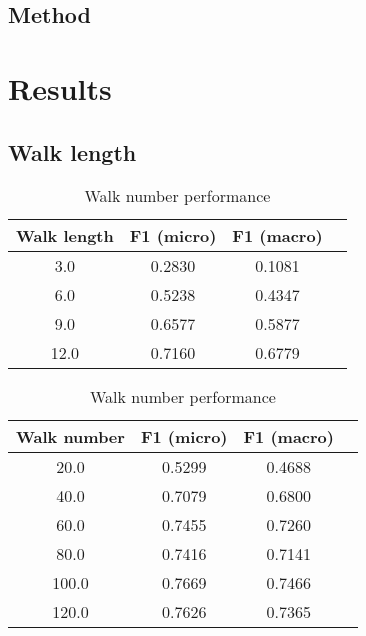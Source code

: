\documentclass[a4paper,10pt]{article}
\begin{document}
\subsection{Method}



\section{Results}

\subsection{Walk length}

\begin{table}[!hbtp]

  \centering

  \begin{minipage}[b]{0.48\textwidth}

    \begin{tabular}{c c c c}

      \hline
      Walk length & F1 (micro)  & F1 (macro) \\
      \hline\hline

      3.0	& 0.2830	& 0.1081 \\
      \hline
      6.0	& 0.5238	& 0.4347 \\
      \hline
      9.0	& 0.6577	& 0.5877 \\
      \hline
      12.0	& 0.7160	& 0.6779 \\
      \hline

    \end{tabular}

    \caption{Walk length performance}
    \label{tbl:cora:performance:walk_length}

  \end{minipage}
\hfill
  \begin{minipage}[b]{0.48\textwidth}

    \begin{tabular}{c c c c}

      \hline
      Walk number & F1 (micro)  & F1 (macro) \\
      \hline\hline

      20.0	&  0.5299	&  0.4688 \\
      \hline
      40.0	&  0.7079	&  0.6800 \\
      \hline
      60.0	&  0.7455	&  0.7260 \\
      \hline
      80.0	&  0.7416	&  0.7141 \\
      \hline
      100.0	&  0.7669	&  0.7466 \\
      \hline
      120.0	&  0.7626	&  0.7365 \\
      \hline

    \end{tabular}

    \caption{Walk number performance}
    \label{tbl:cora:performance:walk_number}

  \end{minipage}

\end{table}
\end{document}
